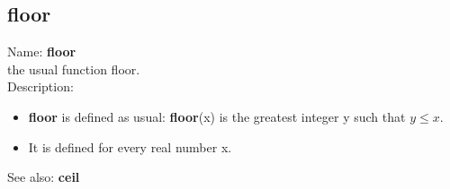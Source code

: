 \subsection{ floor }
\noindent Name: \textbf{floor}\\
the usual function floor.\\

\noindent Description: \begin{itemize}

\item \textbf{floor} is defined as usual: \textbf{floor}(x) is the greatest integer y such that $y \le x$.

\item It is defined for every real number x.
\end{itemize}
See also: \textbf{ceil}
